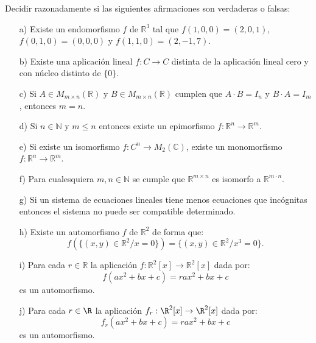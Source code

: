 \begin{ejercicio}
Decidir razonadamente si las siguientes afirmaciones son verdaderas o falsas:
\begin{itemize}
    \item[a)] Existe un endomorfismo $f$ de $\mathbb{R}^3$ tal que $f(1,0,0) = (2,0,1)$, $f(0,1,0) = (0,0,0)$ y $f(1,1,0) = (2,-1,7)$.
    \item[b)] Existe una aplicación lineal $f: C \rightarrow C$ distinta de la aplicación lineal cero y con núcleo distinto de $\{0\}$.
    \item[c)] Si $A \in M_{m \times n}(\mathbb{R})$ y $B \in M_{m \times n}(\mathbb{R})$ cumplen que $A \cdot B = I_n$ y $B \cdot A = I_m$, entonces $m = n$.
    \item[d)] Si $n \in \mathbb{N}$ y $m \leq n$ entonces existe un epimorfismo $f: \mathbb{R}^n \rightarrow \mathbb{R}^m$.
    \item[e)] Si existe un isomorfismo $f: C^n \rightarrow M_2(\mathbb{C})$, existe un monomorfismo $f: \mathbb{R}^n \rightarrow \mathbb{R}^m$.
    \item[f)] Para cualesquiera $m, n \in \mathbb{N}$ se cumple que $\mathbb{R}^{m \times n}$ es isomorfo a $\mathbb{R}^{m \cdot n}$.
    \item[g)] Si un sistema de ecuaciones lineales tiene menos ecuaciones que incógnitas entonces el sistema no puede ser compatible determinado.
    \item[h)] Existe un automorfismo $f$ de $\mathbb{R}^2$ de forma que: 
    $$f(\{ (x,y) \in \mathbb{R}^2 / x=0 \}) = \{ (x,y) \in \mathbb{R}^2 / x^3=0 \}.$$
    \item[i)] Para cada $r \in \mathbb{R}$ la aplicación $f: \mathbb{R}^2[x] \rightarrow \mathbb{R}^2[x]$ dada por:
    $$f(ax^2 + bx + c) = rax^2 + bx + c$$
    es un automorfismo.
    \item[j)] Para cada $r \in \R$ la aplicación $f_r : \R^2[x] \rightarrow \R^2[x]$ dada por: 
    \begin{equation*}
        f_r(ax^2 + bx + c) = rax^2 + bx + c
    \end{equation*}
    es un automorfismo.
\end{itemize}
\end{ejercicio}

